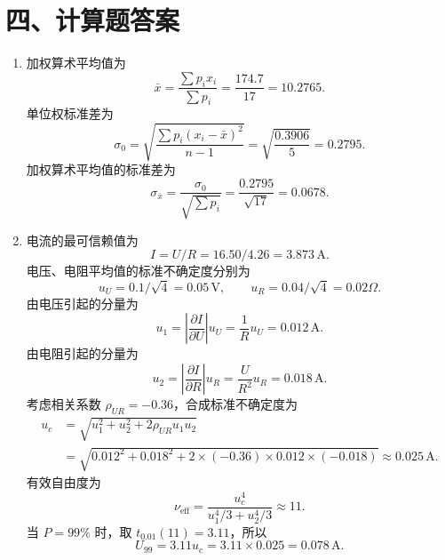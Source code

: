 \documentclass[UTF8,12pt,a4paper]{ctexart}
\begin{document}
\newpage

\section*{四、计算题答案}
\begin{enumerate}[label=\arabic*、]
\item 加权算术平均值为
\begin{equation*}
    \bar{x}=\frac{\sum p_ix_i}{\sum p_i}=\frac{174.7}{17}=10.2765.
\end{equation*}
单位权标准差为
\begin{equation*}
    \sigma_0=\sqrt{\frac{\sum p_i(x_i-\bar{x})^2}{n-1}}
    =\sqrt{\frac{0.3906}{5}}=0.2795.
\end{equation*}
加权算术平均值的标准差为
\begin{equation*}
    \sigma_{\bar{x}}=\frac{\sigma_0}{\sqrt{\sum p_i}}
    =\frac{0.2795}{\sqrt{17}}=0.0678.
\end{equation*}

\item 电流的最可信赖值为
\begin{equation*}
    I=U/R=16.50/4.26=3.873\,\mathrm{A}.
\end{equation*}
电压、电阻平均值的标准不确定度分别为
\begin{equation*}
    u_U=0.1/\sqrt{4}=0.05\,\mathrm{V},\qquad
    u_R=0.04/\sqrt{4}=0.02\Omega.
\end{equation*}
由电压引起的分量为
\begin{equation*}
    u_1=\left|\frac{\partial I}{\partial U}\right|u_U=\frac{1}{R}u_U=0.012\,\mathrm{A}.
\end{equation*}
由电阻引起的分量为
\begin{equation*}
    u_2=\left|\frac{\partial I}{\partial R}\right|u_R=\frac{U}{R^2}u_R=0.018\,\mathrm{A}.
\end{equation*}
考虑相关系数 $\rho_{UR}=-0.36$，合成标准不确定度为
\begin{equation*}
\begin{aligned}
    u_c&=\sqrt{u_1^2+u_2^2+2\rho_{UR}u_1u_2} \\
       &=\sqrt{0.012^2+0.018^2+2\times(-0.36)\times0.012\times(-0.018)}
        \approx0.025\,\mathrm{A}.
\end{aligned}
\end{equation*}
有效自由度为
\begin{equation*}
    \nu_{\mathrm{eff}}=\frac{u_c^4}{u_1^4/3+u_2^4/3}\approx11.
\end{equation*}
当 $P=99\%$ 时，取 $t_{0.01}(11)=3.11$，所以
\begin{equation*}
    U_{99}=3.11u_c=3.11\times0.025=0.078\,\mathrm{A}.
\end{equation*}


\end{enumerate}
\end{document}
